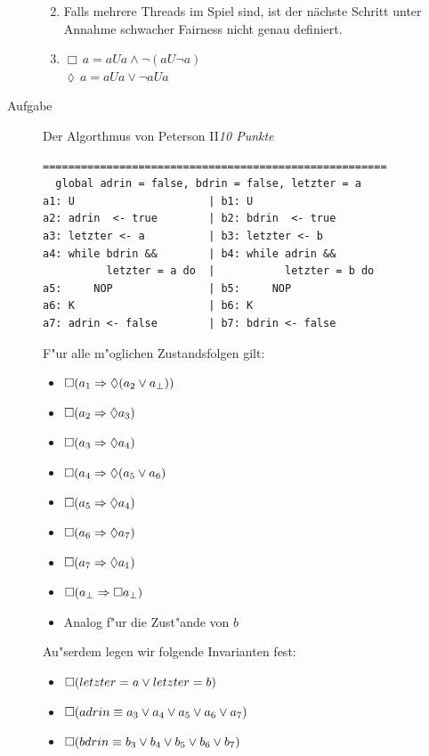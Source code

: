 \documentclass[a4paper,twoside,12pt]{article}
\newcounter{AUFGNR}
\newcommand{\AUFGABE}[2]{\vspace{0.3cm}\item[Aufgabe~\arabic{AUFGNR}]\stepcounter{AUFGNR} #1\hfill\emph{#2}}
\begin{document}
\begin{description}
\begin{enumerate}
\begin{enumerate}
\end{enumerate}

\item 
Falls mehrere Threads im Spiel sind, ist der nächste Schritt unter Annahme schwacher Fairness nicht genau definiert.

\item
$ \Box\, a = aUa \land \neg (aU\neg a)$\\
$ \lozenge\, a = aUa \lor \neg aUa$\\

\end{enumerate}

\AUFGABE{Der Algorthmus von Peterson II}{10 Punkte}
\begin{verbatim}
======================================================
  global adrin = false, bdrin = false, letzter = a
a1: U                     | b1: U
a2: adrin  <- true        | b2: bdrin  <- true
a3: letzter <- a          | b3: letzter <- b
a4: while bdrin &&        | b4: while adrin &&
          letzter = a do  |           letzter = b do
a5:     NOP               | b5:     NOP
a6: K                     | b6: K
a7: adrin <- false        | b7: bdrin <- false
\end{verbatim}
F"ur alle m"oglichen Zustandsfolgen gilt:
\begin{itemize}
	\item $\Box(a_1 \Rightarrow \lozenge (a_2 \vee a_\bot))$
	\item $\Box(a_2 \Rightarrow \lozenge a_3)$
	\item $\Box(a_3 \Rightarrow \lozenge a_4)$
	\item $\Box(a_4 \Rightarrow \lozenge (a_5 \vee a_6)$
	\item $\Box(a_5 \Rightarrow \lozenge a_4)$
	\item $\Box(a_6 \Rightarrow \lozenge a_7)$
	\item $\Box(a_7 \Rightarrow \lozenge a_1)$
	\item $\Box(a_\bot \Rightarrow \Box a_\bot)$
	\item Analog f"ur die Zust"ande von $b$
\end{itemize}

Au"serdem legen wir folgende Invarianten fest:
\begin{itemize}
	\item $\Box(letzter = a \vee letzter = b)$
	\item $\Box(adrin \equiv a_3 \vee a_4 \vee a_5 \vee a_6 \vee a_7)$
	\item $\Box(bdrin \equiv b_3 \vee b_4 \vee b_5 \vee b_6 \vee b_7)$
\end{itemize}


\end{description}
\end{document}

